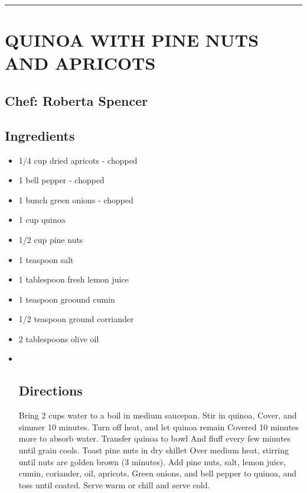 \documentclass[
]{book}
\begin{document}
\begin{center}\rule{0.5\linewidth}{0.5pt}\end{center}

\hypertarget{quinoa-with-pine-nuts-and-apricots}{%
\section*{QUINOA WITH PINE NUTS AND APRICOTS}\label{quinoa-with-pine-nuts-and-apricots}}


\hypertarget{chef-roberta-spencer-9}{%
\subsection*{Chef: Roberta Spencer}\label{chef-roberta-spencer-9}}


\hypertarget{ingredients-35}{%
\subsection*{Ingredients}\label{ingredients-35}}


\begin{itemize}
\item
  1/4 cup dried apricots - chopped
\item
  1 bell pepper - chopped
\item
  1 bunch green onions - chopped
\item
  1 cup quinoa
\item
  1/2 cup pine nuts
\item
  1 teaspoon salt
\item
  1 tablespoon fresh lemon juice
\item
  1 teaspoon groound cumin
\item
  1/2 teaspoon ground corriander
\item
  2 tablespoons olive oil
\item ~
  \hypertarget{directions-35}{%
  \subsection*{Directions}\label{directions-35}}

  Bring 2 cups water to a boil in medium saucepan. Stir in quinoa,
  Cover, and simmer 10 minutes. Turn off heat, and let quinoa remain
  Covered 10 minutes more to absorb water. Transfer quinoa to bowl
  And fluff every few minutes until grain cools. Toast pine nuts in dry skillet
  Over medium heat, stirring until nuts are golden brown (3 minutes).
  Add pine nuts, salt, lemon juice, cumin, coriander, oil, apricots,
  Green onions, and bell pepper to quinoa, and toss until coated.
  Serve warm or chill and serve cold.
\end{itemize}
\end{document}
